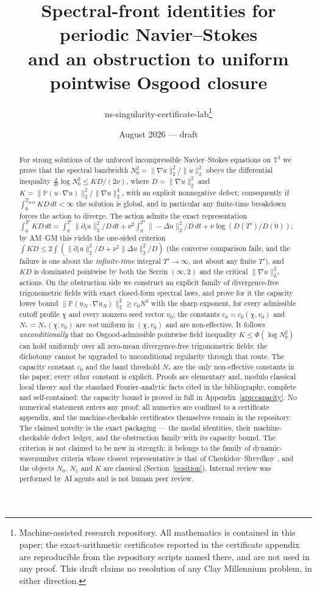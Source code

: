 \documentclass[11pt]{article}
\title{Spectral-front identities for periodic Navier--Stokes\\
and an obstruction to uniform pointwise Osgood closure}
\author{ns-singularity-certificate-lab\thanks{Machine-assisted
research repository. All mathematics is contained in this paper; the
exact-arithmetic certificates reported in the certificate appendix are
reproducible from the repository scripts named there, and are not used
in any proof. This draft claims no resolution of any Clay Millennium
problem, in either direction.}}
\date{August 2026 --- draft}
\theoremstyle{definition}
\newcommand{\T}{\mathbb T}
\newcommand{\PP}{\mathbb P}
\begin{document}
\maketitle

\begin{abstract}
For strong solutions of the unforced incompressible Navier--Stokes
equations on $\T^3$ we prove that the spectral bandwidth
$N_0^2=\|\nabla u\|_2^2/\|u\|_2^2$ obeys the differential inequality
$\frac{d}{dt}\log N_0^2\le K D/(2\nu)$, where
$D=\|\nabla u\|_2^2$ and
$K=\|\PP(u\cdot\nabla u)\|_2^2/\|\nabla u\|_2^4$, with an explicit
nonnegative defect; consequently if
$\int_0^{T_{\max}}KD\,dt<\infty$ the solution is global, and in
particular any finite-time breakdown forces the action to diverge. The
action admits the exact representation
$\int_0^{T'}KD\,dt=\int_0^{T'}\|\partial_tu\|_2^2/D\,dt
+\nu^2\int_0^{T'}\|{-}\Delta u\|_2^2/D\,dt+\nu\log(D(T')/D(0))$; by
AM--GM this yields the one-sided criterion
$\int KD\le2\int(\|\partial_tu\|_2^2/D+\nu^2\|\Delta u\|_2^2/D)$
(the converse comparison fails, and the failure is one about the
\emph{infinite-time} integral $T'\to\infty$, not about any finite
$T'$), and
$KD$ is dominated pointwise by both the Serrin $(\infty,2)$ and the
critical $\|\nabla u\|_{L^3}^2$ actions. On the obstruction side we construct an
explicit family of divergence-free trigonometric fields with exact
closed-form spectral laws, and prove for it the capacity lower bound
$\|\PP(u_N\cdot\nabla u_N)\|_2^2\ge c_0N^3$ with the sharp exponent,
for every admissible cutoff profile $\chi$ and every nonzero seed
vector $v_0$; the constants $c_0=c_0(\chi,v_0)$ and
$N_*=N_*(\chi,v_0)$ are \emph{not} uniform in $(\chi,v_0)$ and are
non-effective. It follows
\emph{unconditionally} that no Osgood-admissible pointwise field
inequality $K\le\Phi(\log N_0^2)$ can hold uniformly over all
zero-mean divergence-free trigonometric fields: the dichotomy
cannot be upgraded to unconditional regularity through that route. The
capacity constant $c_0$ and the band threshold $N_*$ are the only
non-effective constants in the paper; every other constant is explicit.
Proofs are elementary and, modulo classical local theory and the
standard Fourier-analytic facts cited in the bibliography, complete
and self-contained: the capacity bound is proved in full in
Appendix~\ref{app:capacity}. No numerical statement enters any proof;
all numerics are confined to a certificate appendix, and the
machine-checkable certificates themselves remain in the repository. The claimed
novelty is the exact packaging --- the modal identities, their
machine-checkable defect ledger, and the obstruction family with its
capacity bound. The criterion is not claimed to be new in strength:
it belongs to the family of dynamic-wavenumber criteria whose closest
representative is that of Cheskidov--Shvydkoy
\cite{CheskidovShvydkoy2014}, and the objects $N_0$, $N_1$ and $K$ are
classical (Section~\ref{position}). Internal review was performed by
AI agents and is not human peer review.
\end{abstract}
\end{document}
